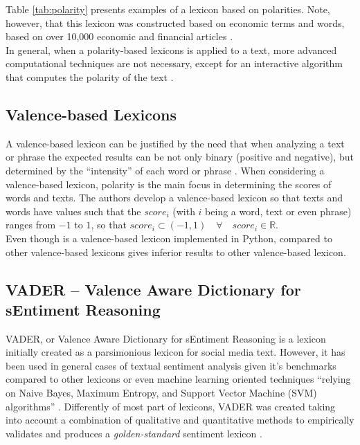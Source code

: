 Table \ref{tab:polarity} presents examples of a lexicon based on polarities. Note, however, that this lexicon was constructed based on economic terms and words, based on over 10,000 economic and financial articles \cite[p.1]{lmdata}.\\

In general, when a polarity-based lexicons is applied to a text, more advanced computational techniques are not necessary, except for an interactive algorithm that computes the polarity of the text \cite[]{BCDG07}. 

\subsection{Valence-based Lexicons}

A valence-based lexicon can be justified by the need that when analyzing a text or phrase the expected results can be not only binary (positive and negative), but determined by the ``intensity'' of each word or phrase \cite[] {hutto2014vader}. When considering a valence-based lexicon, polarity is the main focus in determining the scores of \cite[]{cambria2012senticnet} words and texts. The authors develop a valence-based lexicon so that texts and words have values such that the $score_i$ (with $i$ being a word, text or even phrase) ranges from $-1$ to $1$, so that $ score_i \subset (-1, 1) \quad \forall \quad score_i \in \mathbb{R}$.\\

Even though \cite{cambria2020senticnet} is a valence-based lexicon implemented in Python, compared to other valence-based lexicons \cite[]{hutto2014vader} gives inferior results to other valence-based lexicon.


\subsection{VADER – Valence Aware Dictionary for sEntiment Reasoning} \label{subsec:vader}

VADER, or Valence Aware Dictionary for sEntiment Reasoning is a lexicon initially created as a parsimonious lexicon for social media text. However, it has been used in general cases of textual sentiment analysis given it's benchmarks compared to other lexicons or even machine learning oriented techniques ``relying on Naive Bayes, Maximum Entropy, and Support Vector Machine (SVM) algorithms'' \citep[p.216]{hutto2014vader}. Differently of most part of lexicons, VADER was created taking into account a combination of qualitative and quantitative methods to empirically validates and produces a \textit{golden-standard} sentiment lexicon \cite{hutto2014vader}.\\

